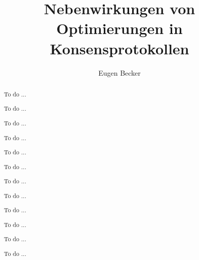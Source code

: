 \documentclass[nonacm,sigconf,natbib=false]{acmart}
\begin{document}
\title{Nebenwirkungen von Optimierungen in Konsensprotokollen} %

\author{Eugen Becker}

\renewcommand{\shortauthors}{Eugen Becker}

\renewcommand{\abstractname}{Kurzfassung}

\renewcommand{\refname}{Literaturverzeichnis}

\begin{abstract}
  To do ...

  To do ...

  To do ...

  To do ...

  To do ...

  To do ...

  To do ...

  To do ...

  To do ...

  To do ...

  To do ...

  To do ...
\end{abstract}


\maketitle
\end{document}

